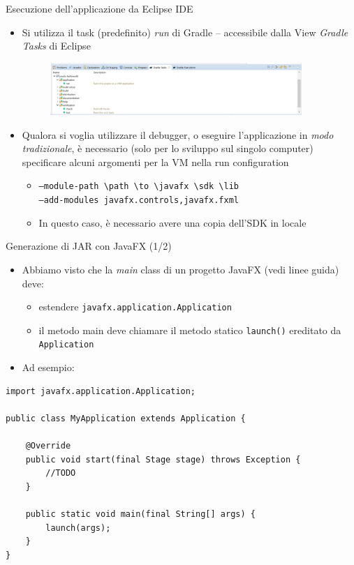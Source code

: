 \documentclass[presentation]{beamer}
\begin{document}
\begin{frame}{Esecuzione dell'applicazione da Eclipse IDE}
\begin{itemize}\itemsep20pt
\item Si utilizza il task (predefinito) \emph{run} di Gradle -- accessibile dalla View \emph{Gradle Tasks} di Eclipse
\begin{figure}
\includegraphics[width=0.9\textwidth]{img/gradle-tasks-view.png}
\end{figure}
\end{itemize}
\begin{itemize}
\item Qualora si voglia utilizzare il debugger, o eseguire l'applicazione in \emph{modo tradizionale}, è necessario (solo per lo sviluppo sul singolo computer) specificare alcuni argomenti per la VM nella run configuration
\begin{itemize}
\item \texttt{--module-path \textbackslash path \textbackslash to \textbackslash javafx \textbackslash sdk \textbackslash lib \\--add-modules javafx.controls,javafx.fxml}
\item In questo caso, è necessario avere una copia dell'SDK in locale
\end{itemize}
\end{itemize}
\end{frame}

\begin{frame}[fragile]{Generazione di JAR con JavaFX (1/2)}
\begin{itemize}
\item Abbiamo visto che la \emph{main} class di un progetto JavaFX (vedi linee guida) deve:
\begin{itemize}
\item estendere \texttt{javafx.application.Application}
\item il metodo main deve chiamare il metodo statico \texttt{launch()} ereditato da \texttt{Application}
\end{itemize}
\item Ad esempio:
\end{itemize}

\begin{footnotesize}
\begin{lstlisting}
import javafx.application.Application;

public class MyApplication extends Application {

	@Override
	public void start(final Stage stage) throws Exception {
		//TODO
	}

	public static void main(final String[] args) {
		launch(args);
	}
}
\end{lstlisting}
\end{footnotesize}
\end{frame}
\end{document}
